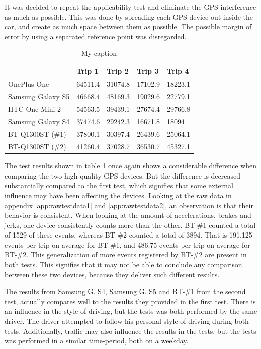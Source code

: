 It was decided to repeat the applicability test and eliminate the GPS interference as much as possible. This was done by spreading each GPS device out inside the car, and create as much space between them as possible. The possible margin of error by using a separated reference point was disregarded. 

\begin{table}[tb]
\centering
\caption{My caption}
\label{tab:smartphone_test_two}
\begin{tabular}{|l|llll|}
\hline
\rowcolor{tablegreen}

                   & Trip 1    & Trip 2    & Trip 3    & Trip 4  \\\hline
OnePlus One        & 64511.4   & 31074.8   & 17102.9   & 18223.1 \\
Samsung Galaxy S5  & 46668.4   & 48169.3   & 19029.6   & 22779.1 \\
HTC One Mini 2     & 54563.5   & 39439.1   & 27674.4   & 29766.8 \\
Samsung Galaxy S4  & 37474.6   & 29242.3   & 16671.8   & 18094   \\
BT-Q1300ST (\#1)   & 37800.1   & 30397.4   & 26439.6   & 25064.1 \\
BT-Q1300ST (\#2)   & 41260.4   & 37028.7   & 36530.7   & 45327.1 \\\hline

\end{tabular}
\end{table}

The test results shown in table \ref{tab:smartphone_test_two} once again shows a considerable difference when comparing the two high quality GPS devices. But the difference is decreased substantially compared to the first test, which signifies that some external influence may have been affecting the devices. Looking at the raw data in appendix \ref{app:rawtestdata1} and \ref{app:rawtestdata2}, an observation is that their behavior is consistent. When looking at the amount of accelerations, brakes and jerks, one device consistently counts more than the other. BT-\#1 counted a total of 1529 of these events, whereas BT-\#2 counted a total of 3894. That is 191.125 events per trip on average for BT-\#1, and 486.75 events per trip on average for BT-\#2. This generalization of more events registered by BT-\#2 are present in both tests. This signifies that it may not be able to conclude any comparison between these two devices, because they deliver such different results.

The results from Samsung G. S4, Samsung G. S5 and BT-\#1 from the second test, actually compares well to the results they provided in the first test. There is an influence in the style of driving, but the tests was both performed by the same driver. The driver attempted to follow his personal style of driving during both tests. Additionally, traffic may also influence the results in the tests, but the tests was performed in a similar time-period, both on a weekday. 

